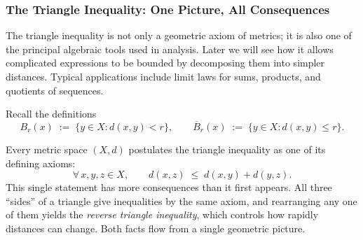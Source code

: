 
\subsubsection{The Triangle Inequality: One Picture, All Consequences}
\label{sec:triangle-inequality-geometry}

\begin{remark*}
The triangle inequality is not only a geometric axiom of metrics;
it is also one of the principal algebraic tools used in analysis.
Later we will see how it allows complicated expressions to be
bounded by decomposing them into simpler distances.
Typical applications include limit laws for sums, products,
and quotients of sequences.
\end{remark*}

Recall the definitions
\[
B_r(x) \;:=\; \{y\in X : d(x,y)<r\},
\qquad
\overline{B}_r(x) \;:=\; \{y\in X : d(x,y)\le r\}.
\]

Every metric space $(X,d)$ postulates the triangle inequality as one of
its defining axioms:
\[
\forall\,x,y,z \in X,\qquad d(x,z) \;\le\; d(x,y) + d(y,z).
\]
This single statement has more consequences than it first appears.
All three ``sides'' of a triangle give inequalities by the same axiom,
and rearranging any one of them yields the \emph{reverse triangle
inequality}, which controls how rapidly distances can change.
Both facts flow from a single geometric picture.

